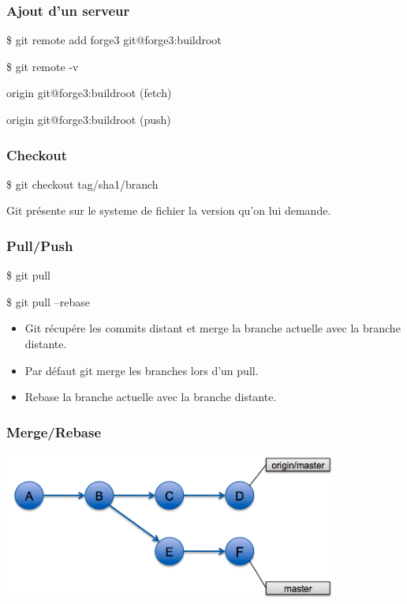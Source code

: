 \documentclass{beamer}
\begin{document}
\begin{frame}
  \frametitle{Ajout d'un serveur}
  \begin{semiverbatim}
    \$ git remote add forge3 git@forge3:buildroot

    \$ git remote -v

    origin git@forge3:buildroot (fetch)

    origin git@forge3:buildroot (push)

  \end{semiverbatim}
\end{frame}

\begin{frame}
  \frametitle{Checkout}
  \begin{semiverbatim}
    \$ git checkout tag/sha1/branch
    
    Git présente sur le systeme de fichier la version qu'on lui demande.
  \end{semiverbatim}
\end{frame}

\begin{frame}
  \frametitle{Pull/Push}
  \begin{semiverbatim}
    \$ git pull

    \$ git pull --rebase
  \end{semiverbatim}
  \begin{itemize}
  \item Git récupére les commits distant et merge la branche actuelle avec la branche distante.
  \item Par défaut git merge les branches lors d'un pull.
  \item Rebase la branche actuelle avec la branche distante.
  \end{itemize}
\end{frame}

\begin{frame}
\frametitle{Merge/Rebase}
    \begin{center}
     \includegraphics[width=11cm]{imgs/before-merge.png}
     \end{center}
\end{frame}
\end{document}
